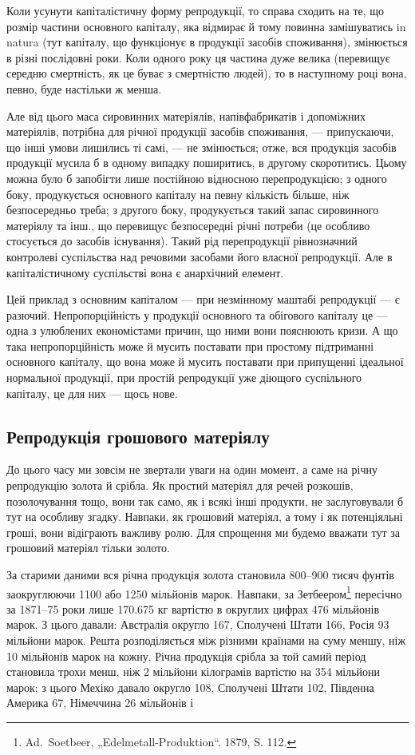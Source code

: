 Коли усунути капіталістичну форму репродукції, то справа сходить
на те, що розмір частини основного капіталу, яка відмирає й тому
повинна замішуватись in natura (тут капіталу, що функціонує в продукції
засобів споживання), змінюється в різні послідовні роки. Коли одного
року ця частина дуже велика (перевищує середню смертність, як це
буває з смертністю людей), то в наступному році вона, певно, буде
настільки ж менша.

Але від цього маса сировинних матеріялів, напівфабрикатів і допоміжних
матеріялів, потрібна для річної продукції засобів споживання, — припускаючи,
що інші умови лишились ті самі, — не змінюється; отже, вся
продукція засобів продукції мусила б в одному випадку поширитись, в
другому скоротитись. Цьому можна було б запобігти лише постійною
відносною перепродукцією; з одного боку, продукується основного
капіталу на певну кількість більше, ніж безпосередньо треба; з другого
боку, продукується такий запас сировинного матеріялу та інш., що
перевищує безпосередні річні потреби (це особливо стосується до засобів
існування). Такий рід перепродукції рівнозначний контролеві суспільства
над речовими засобами його власної репродукції. Але в капіталістичному
суспільстві вона є анархічний елемент.

Цей приклад з основним капіталом — при незмінному маштабі репродукції
— є разючий. Непропорційність у продукції основного та обігового
капіталу це — одна з улюблених економістами причин, що ними вони
пояснюють кризи. А що така непропорційність може й мусить поставати
при простому підтриманні основного капіталу, що вона може й
мусить поставати при припущенні ідеальної нормальної продукції, при
простій репродукції уже діющого суспільного капіталу, це для них — щось
нове.

\subsection{Репродукція грошового матеріялу}

До цього часу ми зовсім не звертали уваги на один момент, а саме
на річну репродукцію золота й срібла. Як простий матеріял для речей
розкошів, позолочування тощо, вони так само, як і всякі інші продукти,
не заслуговували б тут на особливу згадку. Навпаки, як грошовий
матеріял, а тому і як потенціяльні гроші, вони відіграють важливу ролю.
Для спрощення ми будемо вважати тут за грошовий матеріял тільки золото.

За старими даними вся річна продукція золота становила 800--900
тисяч фунтів \deq{} заокруглюючи 1100 або 1250 мільйонів марок. Навпаки,
за Зетбеером\footnote{Ad.~Soetbeer, „Edelmetall-Produktion“. 1879, S. 112.} пересічно за 1871--75 роки лише \num{170.675} кг вартістю
в округлих цифрах 476 мільйонів марок. З цього давали: Австралія
округло 167, Сполучені Штати 166, Росія 93 мільйони марок. Решта
розподіляється між різними країнами на суму меншу, ніж 10 мільйонів
марок на кожну. Річна продукція срібла за той самий період становила
трохи менш, ніж 2 мільйони кілограмів вартістю на 354 мільйони
марок; з цього Мехіко давало округло 108, Сполучені Штати 102,
Південна Америка 67, Німеччина 26 мільйонів і~

